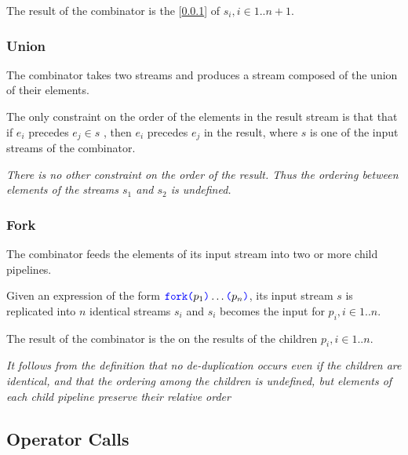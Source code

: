\documentclass{article}
\begin{document}
 The result of the \IF{} combinator is the \UNION{} [\ref{union}] of $s_i, i  \in 1..n+1$.

\subsubsection{Union}
\label{union}

The \UNION{} combinator takes two streams and produces a stream composed of the union of their elements. 

\Union{}

The only constraint on the order of the elements in the result stream is that that if $e_i$ precedes $e_j \in s$ , then  $e_i$ precedes $e_j$ in the result, where $s$  is one of the input streams of the \UNION{} combinator. 

{\em There is no other constraint on the order of the result. Thus the ordering between elements of the streams $s_1$ and $s_2$ is undefined.
}


\subsubsection{Fork}
\label{fork}

The \FORK{} combinator feeds the elements of its input stream into two or more  child pipelines.

\ForkExpression{}

Given an \FORK{} expression of the form $\texttt{\color{blue} fork}{}  \texttt{\color{blue} (}{} p_1 \texttt{\color{blue} )}{} \ldots  \texttt{\color{blue} (}{} p_n \texttt{\color{blue} )}{}$, its input stream $s$ is replicated into $n$ identical streams $s_i$ and $s_i$  becomes the input for $p_i,  i \in 1..n$.

The result of the \FORK{} combinator is the \UNION [\ref{union}] on the results of the children $p_i, i \in 1..n$.

{\em It follows from the definition \UNION{} that  no de-duplication occurs even if the children are identical, and that the ordering among the children is undefined, but elements of each child pipeline preserve their relative order }

\subsection{Operator Calls}
\label{operatorCalls}
\end{document}
